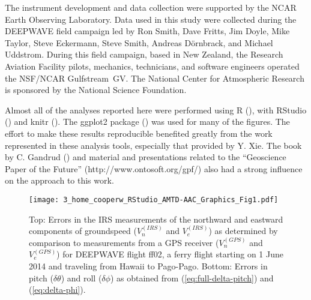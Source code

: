 \documentclass[english,british,amtd,bookmarks=false,unicode=true]{copernicus}\usepackage[]{graphicx}\usepackage[]{color}
\begin{document}
\begin{acknowledgements}
The instrument development and data collection were supported by the
NCAR Earth Observing Laboratory. Data used in this study were collected
during the DEEPWAVE field campaign led by Ron Smith, Dave Fritts,
Jim Doyle, Mike Taylor, Steve Eckermann, Steve Smith, Andreas D\"ornbrack,
and Michael Uddstrom. During this field campaign, based in New Zealand,
the Research Aviation Facility pilots, mechanics, technicians, and
software engineers operated the NSF/NCAR Gulfstream~GV. The National
Center for Atmospheric Research is sponsored by the National Science
Foundation. 

Almost all of the analyses reported here were performed using R (\citet{Rlanguage}),
with RStudio (\citet{RStudio2012}) and knitr (\citet{Xie2014a,Xie2014b}).
The \textquotedbl{}ggplot2\textquotedbl{} package (\citet{wickham2009})
was used for many of the figures. The effort to make these results
reproducible benefited greatly from the work represented in these
analysis tools, especially that provided by Y. Xie. The book by C.
Gandrud (\citet{Gandrud2014}) and material and presentations related
to the ``Geoscience Paper of the Future'' (http://www.ontosoft.org/gpf/)
also had a strong influence on the approach to this work.

\clearpage
\end{acknowledgements}


\clearpage

\begin{center}
\begin{figure}
\begin{centering}
\texttt{[image: 3\_home\_cooperw\_RStudio\_AMTD-AAC\_Graphics\_Fig1.pdf]}
\par\end{centering}

\caption{Top: Errors in the IRS measurements of the northward and eastward components of groundspeed ($V_n^{(IRS)}$ and $V_e^{(IRS)}$) as determined by comparison to measurements from a GPS receiver ($V_n^{(GPS)}$ and $V_e^{(GPS)}$) for DEEPWAVE flight ff02, a ferry flight starting on 1 June 2014 and traveling from Hawaii to Pago-Pago. Bottom: Errors in pitch ($\delta\theta$) and roll ($\delta\phi$) as obtained from (\ref{eq:full-delta-pitch}) and (\ref{eq:delta-phi}).\label{fig:v-errors-straight-leg}%
}
\end{figure}

\par\end{center}
\end{document}
